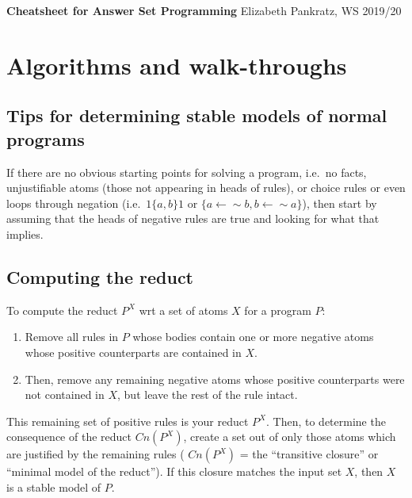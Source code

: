 \documentclass[9pt,a4paper,landscape]{article}
\begin{document}
	
	
{\small
	
\textbf{Cheatsheet for Answer Set Programming} \hfill Elizabeth Pankratz, WS 2019/20
	
\section{Algorithms and walk-throughs}

\vspace{\baselineskip}


\subsection{Tips for determining stable models of normal programs}

If there are no obvious starting points for solving a program, i.e.\ no facts, unjustifiable atoms (those not appearing in heads of rules), or choice rules or even loops through negation (i.e.\ $1\{a, b\}1$ or $\{a \leftarrow {\sim} b, b \leftarrow {\sim} a\}$), then start by assuming that the heads of negative rules are true and looking for what that implies.\\

\vspace{\baselineskip}


\subsection{Computing the reduct}
\label{subsec:reduct}

To compute the reduct $P^X$ wrt a set of atoms $X$ for a program $P$:

\begin{enumerate}[noitemsep]
	\item Remove all rules in $P$ whose bodies contain one or more negative atoms whose positive counterparts are contained in $X$.
	\item Then, remove any remaining negative atoms whose positive counterparts were not contained in $X$, but leave the rest of the rule intact.
\end{enumerate}

\noindent This remaining set of positive rules is your reduct $P^X$.
Then, to determine the consequence of the reduct $Cn(P^X)$, create a set out of only those atoms which are justified by the remaining rules ( $Cn(P^X)$ = the ``transitive closure'' or ``minimal model of the reduct'').
If this closure matches the input set $X$, then $X$ is a stable model of $P$.\\

}
\end{document}
